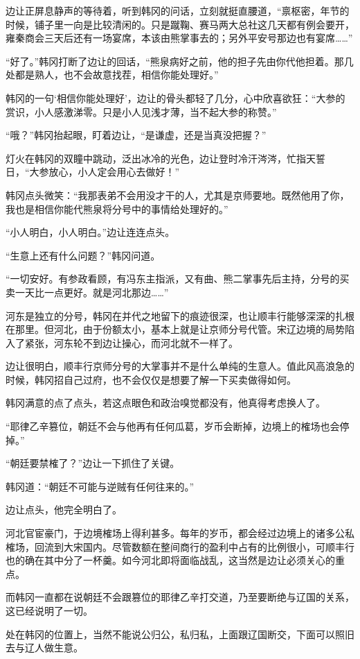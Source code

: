 边让正屏息静声的等待着，听到韩冈的问话，立刻就挺直腰道，“禀枢密，年节的时候，铺子里一向是比较清闲的。只是蹴鞠、赛马两大总社这几天都有例会要开，雍秦商会三天后还有一场宴席，本该由熊掌事去的；另外平安号那边也有宴席……”

“好了。”韩冈打断了边让的回话，“熊泉病好之前，他的担子先由你代他担着。那几处都是熟人，也不会故意找茬，相信你能处理好。”

韩冈的一句‘相信你能处理好’，边让的骨头都轻了几分，心中欣喜欲狂：“大参的赏识，小人感激涕零。只是小人见浅才薄，当不起大参的称赞。”

“哦？”韩冈抬起眼，盯着边让，“是谦虚，还是当真没把握？”

灯火在韩冈的双瞳中跳动，泛出冰冷的光色，边让登时冷汗涔涔，忙指天誓日，“大参放心，小人定会用心去做好！”

韩冈点头微笑：“我那表弟不会用没才干的人，尤其是京师要地。既然他用了你，我也是相信你能代熊泉将分号中的事情给处理好的。”

“小人明白，小人明白。”边让连连点头。

“生意上还有什么问题？”韩冈问道。

“一切安好。有参政看顾，有冯东主指派，又有曲、熊二掌事先后主持，分号的买卖一天比一点更好。就是河北那边……”

河东是独立的分号，韩冈在并代之地留下的痕迹很深，也让顺丰行能够深深的扎根在那里。但河北，由于份额太小，基本上就是让京师分号代管。宋辽边境的局势陷入了紧张，河东轮不到边让操心，而河北就不一样了。

边让很明白，顺丰行京师分号的大掌事并不是什么单纯的生意人。值此风高浪急的时候，韩冈招自己过府，也不会仅仅是想要了解一下买卖做得如何。

韩冈满意的点了点头，若这点眼色和政治嗅觉都没有，他真得考虑换人了。

“耶律乙辛篡位，朝廷不会与他再有任何瓜葛，岁币会断掉，边境上的榷场也会停掉。”

“朝廷要禁榷了？”边让一下抓住了关键。

韩冈道：“朝廷不可能与逆贼有任何往来的。”

边让点头，他完全明白了。

河北官宦豪门，于边境榷场上得利甚多。每年的岁币，都会经过边境上的诸多公私榷场，回流到大宋国内。尽管数额在整间商行的盈利中占有的比例很小，可顺丰行也的确在其中分了一杯羹。如今河北即将面临战乱，这当然是边让必须关心的重点。

而韩冈一直都在说朝廷不会跟篡位的耶律乙辛打交道，乃至要断绝与辽国的关系，这已经说明了一切。

处在韩冈的位置上，当然不能说公归公，私归私，上面跟辽国断交，下面可以照旧去与辽人做生意。

